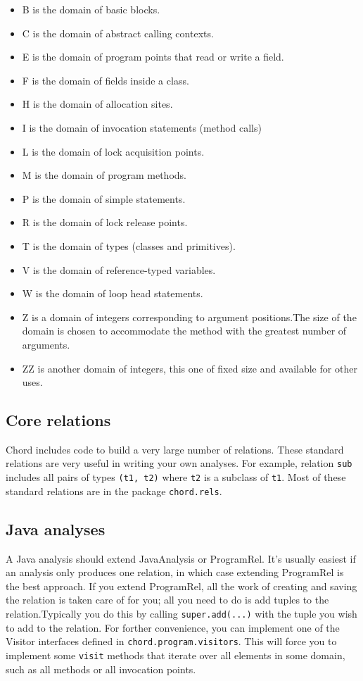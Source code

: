 \begin{itemize}
\item
B is the domain of basic blocks.
\item
C is the domain of abstract calling contexts.
\item
E is the domain of program points that read or write a field.
\item
F is the domain of fields inside a class.
\item
H is the domain of allocation sites.
\item
I is the domain of invocation statements (method calls)
\item
L is the domain of lock acquisition points.
\item
M is the domain of program methods.
\item
P is the domain of simple statements. %
\item
R is the domain of lock release points.
\item
T is the domain of types (classes and primitives).
\item
V is the domain of reference-typed variables.
\item
W is the domain of loop head statements. %
\item
Z is a domain of integers corresponding to argument positions.The size of the domain is chosen to 
accommodate the method with the greatest number of arguments.
\item
ZZ is another domain of integers, this one of fixed size and available for other uses.
\end{itemize}

\subsection{Core relations}

Chord includes code to build a very large number of relations. These standard relations
are very useful in writing your own analyses.
For example, relation \texttt{sub} includes all pairs of types \texttt{(t1, t2)} where \texttt{t2} is a subclass of \texttt{t1}.
Most of these standard relations are in the package \texttt{chord.rels}.

\subsection{Java analyses}

A Java analysis should extend JavaAnalysis or ProgramRel.  It's usually easiest if an analysis
only produces one relation, in which case extending ProgramRel is the best approach.
If you extend ProgramRel, all the work of creating and saving the relation is taken care of for you;
all you need to do is add tuples to the relation.Typically you do this by calling
\texttt{super.add(...)} with the tuple you wish to add to the relation.
For forther convenience, you can implement one of the Visitor interfaces defined in 
\texttt{chord.program.visitors}.  This will force you to implement some \texttt{visit} methods that iterate over
all elements in some domain, such as all methods or all invocation points. 


